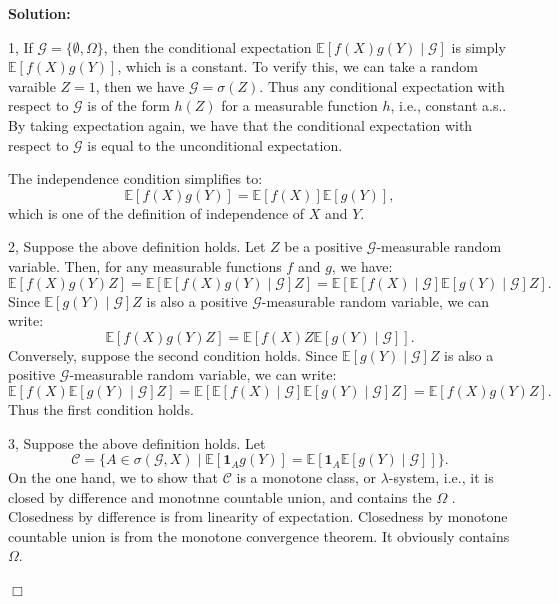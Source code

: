 \documentclass[12pt]{article}
\newenvironment{solution}{\vspace{0.2cm}\color{blue}\textbf{Solution:}}{\hfill\ensuremath{\Box}}
\begin{document}
\begin{solution}

1,
    If $\mathcal{G} = \{\emptyset, \Omega\}$, then the conditional expectation $\mathbb{E}[f(X)g(Y) \mid \mathcal{G}]$ is simply $\mathbb{E}[f(X)g(Y)]$, which is a constant. To verify this, we can take a random varaible $Z=1$, then we have $\mathcal{G}=\sigma(Z)$. Thus any conditional expectation with respect to $\mathcal{G}$ is of the form $h(Z)$ for a measurable function $h$, i.e., constant a.s..
    By taking expectation again, we have that the conditional expectation with respect to $\mathcal{G}$ is equal to the unconditional expectation.
    
    The independence condition simplifies to:
    \[\mathbb{E}[f(X)g(Y)] = \mathbb{E}[f(X)]\mathbb{E}[g(Y)],\]
    which is one of the definition of independence of $X$ and $Y$.

2,
    Suppose the above definition holds. Let $Z$ be a positive $\mathcal{G}$-measurable random variable. Then, for any measurable functions $f$ and $g$, we have:
    \[\mathbb{E}[f(X)g(Y)Z] = \mathbb{E}[\mathbb{E}[f(X)g(Y) \mid \mathcal{G}]Z] = \mathbb{E}[\mathbb{E}[f(X) \mid \mathcal{G}]\mathbb{E}[g(Y) \mid \mathcal{G}]Z].\]
    Since $\mathbb{E}[g(Y) \mid \mathcal{G}]Z$ is also a positive $\mathcal{G}$-measurable random variable, we can write:
    \[\mathbb{E}[f(X)g(Y)Z] = \mathbb{E}[f(X)Z\mathbb{E}[g(Y) \mid \mathcal{G}]].\]
    Conversely, suppose the second condition holds. Since $\mathbb{E}[g(Y) \mid \mathcal{G}]Z$ is also a positive $\mathcal{G}$-measurable random variable, we can write:
    \[\mathbb{E}[f(X)\mathbb{E}[g(Y) \mid \mathcal{G}]Z] = \mathbb{E}[\mathbb{E}[f(X) \mid \mathcal{G}]\mathbb{E}[g(Y) \mid \mathcal{G}]Z]=\mathbb{E}[f(X)g(Y)Z].\]
    Thus the first condition holds.

3,
    Suppose the above definition holds. Let \[\mathcal{C}=\{ A \in \sigma(\mathcal{G},X) \mid \mathbb{E}[\mathbf{1}_A g(Y)] = \mathbb{E}[\mathbf{1}_A\mathbb{E}[g(Y) \mid \mathcal{G}]]\}.\]
    On the one hand, we to show that $\mathcal{C}$ is a monotone class, or $\lambda$-system, i.e., it is closed by difference and monotnne countable union, and contains the $\Omega$ .
    Closedness by difference is from linearity of expectation. Closedness by monotone countable union is from the monotone convergence theorem. It obviously contains $\Omega$.


\end{solution}
\end{document}
